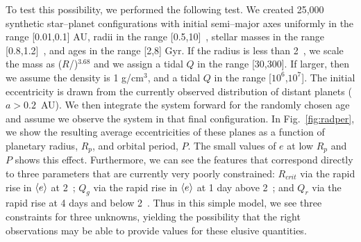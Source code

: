 To test this possibility, we performed the following test. We created
25,000 synthetic star--planet configurations with initial semi--major
axes uniformly in the range [0.01,0.1] AU, radii in the range
[0.5,10]~\rearth, stellar masses in the range [0.8,1.2]~\msun, and
ages in the range [2,8] Gyr.  If the radius is less than 2~\rearth, we
scale the mass as ($R$/\rearth)$^{3.68}$\mearth \citep{Sotin07} and we
assign a tidal $Q$ in the range [30,300].  If larger, then we assume
the density is 1 g/cm$^3$, and a tidal $Q$ in the range
[$10^6$,$10^7$].  The initial eccentricity is drawn from the currently
observed distribution of distant planets ($a > 0.2$~AU).  We then
integrate the system forward for the randomly chosen age and assume we
observe the system in that final configuration. In
Fig.~\ref{fig:radper}, we show the resulting average eccentricities of
these planes as a function of planetary radius, $R_p$, and orbital
period, $P$.  The small values of $e$ at low $R_p$ and $P$ shows this
effect.  Furthermore, we can see the features that correspond directly
to three parameters that are currently very poorly constrained:
$R_{crit}$ via the rapid rise in $\left< e \right>$ at 2~\rearth; $Q_g$ via the
rapid rise in $\left< e \right>$ at 1 day above 2~\rearth; and $Q_r$ via the
rapid rise at 4 days and below 2~\rearth.  Thus in this simple model,
we see three constraints for three unknowns, yielding the possibility
that the right observations may be able to provide values for these
elusive quantities.

